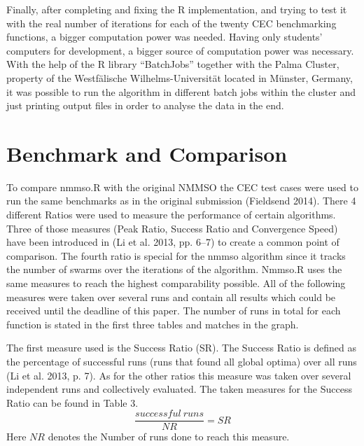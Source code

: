 \documentclass[12pt,a4paper]{article}
\begin{document}
Finally, after completing and fixing the R implementation, and trying to
test it with the real number of iterations for each of the twenty CEC
benchmarking functions, a bigger computation power was needed. Having
only students' computers for development, a bigger source of computation
power was necessary. With the help of the R library ``BatchJobs''
together with the Palma Cluster, property of the Westfälische
Wilhelms-Universität located in Münster, Germany, it was possible to run
the algorithm in different batch jobs within the cluster and just
printing output files in order to analyse the data in the end.

\section{Benchmark and Comparison}\label{benchmark-and-comparison}

To compare nmmso.R with the original NMMSO the CEC test cases were used
to run the same benchmarks as in the original submission (Fieldsend
2014). There 4 different Ratios were used to measure the performance of
certain algorithms. Three of those measures (Peak Ratio, Success Ratio
and Convergence Speed) have been introduced in (Li et al. 2013, pp.
6--7) to create a common point of comparison. The fourth ratio is
special for the nmmso algorithm since it tracks the number of swarms
over the iterations of the algorithm. Nmmso.R uses the same measures to
reach the highest comparability possible. All of the following measures
were taken over several runs and contain all results which could be
received until the deadline of this paper. The number of runs in total
for each function is stated in the first three tables and matches in the
graph.

The first measure used is the Success Ratio (SR). The Success Ratio is
defined as the percentage of successful runs (runs that found all global
optima) over all runs (Li et al. 2013, p. 7). As for the other ratios
this measure was taken over several independent runs and collectively
evaluated. The taken measures for the Success Ratio can be found in
Table 3. \[\frac{successful\ runs}{NR} = SR \] Here \(NR\) denotes the
Number of runs done to reach this measure. \newline
\end{document}
